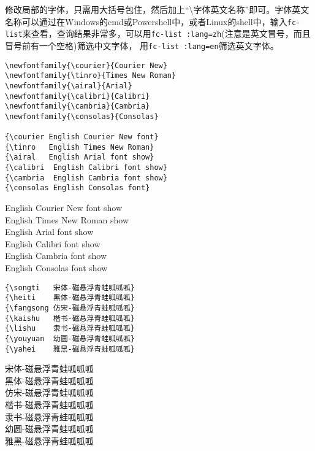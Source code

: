 \documentclass{article}
\begin{document}
\begin{multicols}{2}
\begin{enumerate}
修改局部的字体，只需用大括号包住，然后加上“\textbackslash 字体英文名称”即可。字体英文名称可以通过在Windows的cmd或Powershell中，或者Linux的shell中，输入\verb|fc-list|来查看，查询结果非常多，可以用\verb|fc-list :lang=zh|(注意是英文冒号，而且冒号前有一个空格)筛选中文字体，
用\verb|fc-list :lang=en|筛选英文字体。
\begin{lstlisting}
\newfontfamily{\courier}{Courier New}
\newfontfamily{\tinro}{Times New Roman}
\newfontfamily{\airal}{Arial}
\newfontfamily{\calibri}{Calibri}
\newfontfamily{\cambria}{Cambria}
\newfontfamily{\consolas}{Consolas}

{\courier English Courier New font}
{\tinro   English Times New Roman}
{\airal   English Arial font show}
{\calibri  English Calibri font show}
{\cambria  English Cambria font show}
{\consolas English Consolas font}
\end{lstlisting} 
{\courier English Courier New font show} \\  
{\tinro   English Times New Roman show} \\  
{\airal   English Arial font show} \\  
{\calibri  English Calibri font show} \\  
{\cambria  English Cambria font show} \\  
{\consolas English Consolas font show}   
\begin{lstlisting}
{\songti   宋体-磁悬浮青蛙呱呱呱}
{\heiti    黑体-磁悬浮青蛙呱呱呱}
{\fangsong 仿宋-磁悬浮青蛙呱呱呱}
{\kaishu   楷书-磁悬浮青蛙呱呱呱}
{\lishu    隶书-磁悬浮青蛙呱呱呱}
{\youyuan  幼圆-磁悬浮青蛙呱呱呱}
{\yahei    雅黑-磁悬浮青蛙呱呱呱}
\end{lstlisting} 
{\songti   宋体-磁悬浮青蛙呱呱呱} \\ 
{\heiti    黑体-磁悬浮青蛙呱呱呱} \\  
{\fangsong 仿宋-磁悬浮青蛙呱呱呱} \\   
{\kaishu   楷书-磁悬浮青蛙呱呱呱} \\  
{\lishu    隶书-磁悬浮青蛙呱呱呱} \\  
{\youyuan  幼圆-磁悬浮青蛙呱呱呱} \\
{\yahei    雅黑-磁悬浮青蛙呱呱呱}  


\end{enumerate}
\end{multicols}
\end{document}

